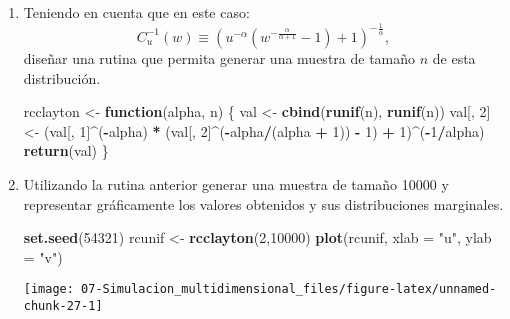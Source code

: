 \documentclass[
]{book}
\newenvironment{Shaded}{\begin{snugshade}}{\end{snugshade}}
\newcommand{\ControlFlowTok}[1]{\textcolor[rgb]{0.13,0.29,0.53}{\textbf{#1}}}
\newcommand{\DataTypeTok}[1]{\textcolor[rgb]{0.13,0.29,0.53}{#1}}
\newcommand{\DecValTok}[1]{\textcolor[rgb]{0.00,0.00,0.81}{#1}}
\newcommand{\KeywordTok}[1]{\textcolor[rgb]{0.13,0.29,0.53}{\textbf{#1}}}
\newcommand{\NormalTok}[1]{#1}
\newcommand{\OperatorTok}[1]{\textcolor[rgb]{0.81,0.36,0.00}{\textbf{#1}}}
\newcommand{\StringTok}[1]{\textcolor[rgb]{0.31,0.60,0.02}{#1}}
\theoremstyle{break}
\theoremstyle{definition}
\theoremstyle{definition}
\theoremstyle{definition}
\theoremstyle{remark}
\begin{document}
\begin{enumerate}
\def\labelenumi{\alph{enumi})}
\item
  Teniendo en cuenta que en este caso:
  \[C_{u}^{-1}(w)\equiv\left(  u^{-\alpha}\left(  
  w^{-\frac{\alpha}{\alpha+1}}-1\right) + 1 \right)^{-\frac{1}{\alpha}},\]
  diseñar una rutina que permita generar una muestra de tamaño \(n\)
  de esta distribución.

\begin{Shaded}
\begin{Highlighting}[]
\NormalTok{rcclayton <-}\StringTok{ }\ControlFlowTok{function}\NormalTok{(alpha, n) \{}
\NormalTok{  val <-}\StringTok{ }\KeywordTok{cbind}\NormalTok{(}\KeywordTok{runif}\NormalTok{(n), }\KeywordTok{runif}\NormalTok{(n))}
\NormalTok{  val[, }\DecValTok{2}\NormalTok{] <-}\StringTok{ }\NormalTok{(val[, }\DecValTok{1}\NormalTok{]}\OperatorTok{^}\NormalTok{(}\OperatorTok{-}\NormalTok{alpha) }\OperatorTok{*}\StringTok{ }
\StringTok{              }\NormalTok{(val[, }\DecValTok{2}\NormalTok{]}\OperatorTok{^}\NormalTok{(}\OperatorTok{-}\NormalTok{alpha}\OperatorTok{/}\NormalTok{(alpha }\OperatorTok{+}\StringTok{ }\DecValTok{1}\NormalTok{)) }\OperatorTok{-}\StringTok{ }\DecValTok{1}\NormalTok{) }\OperatorTok{+}\StringTok{ }\DecValTok{1}\NormalTok{)}\OperatorTok{^}\NormalTok{(}\OperatorTok{-}\DecValTok{1}\OperatorTok{/}\NormalTok{alpha)}
  \KeywordTok{return}\NormalTok{(val)}
\NormalTok{\}}
\end{Highlighting}
\end{Shaded}
\item
  Utilizando la rutina anterior generar una muestra de tamaño
  10000 y representar gráficamente los valores obtenidos y sus
  distribuciones marginales.

\begin{Shaded}
\begin{Highlighting}[]
\KeywordTok{set.seed}\NormalTok{(}\DecValTok{54321}\NormalTok{)}
\NormalTok{rcunif <-}\StringTok{ }\KeywordTok{rcclayton}\NormalTok{(}\DecValTok{2}\NormalTok{,}\DecValTok{10000}\NormalTok{)}
\KeywordTok{plot}\NormalTok{(rcunif, }\DataTypeTok{xlab =} \StringTok{"u"}\NormalTok{, }\DataTypeTok{ylab =} \StringTok{"v"}\NormalTok{)}
\end{Highlighting}
\end{Shaded}

  \begin{center}\texttt{[image: 07-Simulacion\_multidimensional\_files/figure-latex/unnamed-chunk-27-1]} \end{center}


\end{enumerate}
\end{document}
